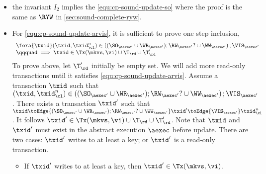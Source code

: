 \begin{itemize}
\item the invariant \( I_2 \) implies the \cref{equ:cp-sound-update-so} where the proof is the same as \( \RYW \) in \cref{sec:sound-complete-ryw}.

\item For \cref{equ:cp-sound-update-arvis}, it is sufficient to prove one step inclusion, \ie
\[
    \begin{array}{l}
    \fora{\txid} (\txid, \txid_\cl^n) \in \left( (\SO_{\aexec'} \cup \WR_{\aexec'} ) ; \RW_{\aexec'}? \cup \WW_{\aexec'} \right) ; \VIS_{\aexec'} \\
    \qqquad \implies \txid \in \Tx(\mkvs, \vi) \cup \T_\rd \cup \T'_\rd 
\end{array}
\]
To prove above, let \( \T'_\rd \) initially be empty set.
We will add more read-only transactions until it satisfies \cref{equ:cp-sound-update-arvis}.
Assume a transaction \( \txid \) such that 
\( (\txid, \txid_\cl^n) \in \left( (\SO_{\aexec'} \cup \WR_{\aexec'} ) ; \RW_{\aexec'}? \cup \WW_{\aexec'} \right) ; \VIS_{\aexec'}\).
There exists a transaction \( \txid' \) such that \( \txid \toEdge{(\SO_{\aexec'} \cup \WR_{\aexec'} ) ; \RW_{\aexec'}? \cup \WW_{\aexec'}} \txid' \toEdge{\VIS_{\aexec'}}  \txid_\cl^n \).
It follows \( \txid'  \in \Tx(\mkvs, \vi) \cup \T_\rd \cup \T'_\rd  \).
Note that \( \txid \) and \( \txid' \) must exist in the abstract execution \( \aexec \) before update.
There are two cases: \( \txid' \) writes to at least a key; or \( \txid' \) is a read-only transaction.
\begin{itemize}
    \item
    If \( \txid' \) writes to at least a key, then \( \txid' \in \Tx(\mkvs, \vi)\).

\end{itemize}
\end{itemize}
